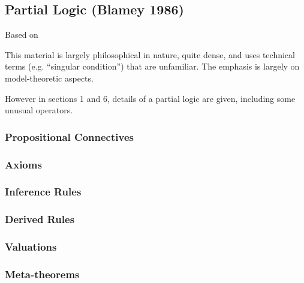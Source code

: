 \subsection{Partial Logic (Blamey 1986)}
Based on \cite{Blamey86}

This material is largely philosophical in nature,
quite dense, and uses technical terms (e.g. ``singular condition'')
that are unfamiliar.
The emphasis is largely on model-theoretic aspects.

However in sections 1 and 6, details of a partial logic
are given, including some unusual operators.


\subsubsection{Propositional Connectives}


\subsubsection{Axioms}


\subsubsection{Inference Rules}


\subsubsection{Derived Rules}


\subsubsection{Valuations}


\subsubsection{Meta-theorems}

